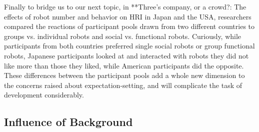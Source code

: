 \documentclass{sfuthesis}
\begin{document}
Finally to bridge us to our next topic, in **Three's company, or a crowd?: The effects of robot number and behavior on HRI in Japan and the USA, researchers compared the reactions of participant pools drawn from two different countries to groups vs. individual robots and social vs. functional robots. Curiously, while participants from both countries preferred single social robots or group functional robots, Japanese participants looked at and interacted with robots they did not like more than those they liked, while American participants did the opposite. These differences between the participant pools add a whole new dimension to the concerns raised about expectation-setting, and will complicate the task of development considerably.








\subsection{Influence of Background}
\end{document}
